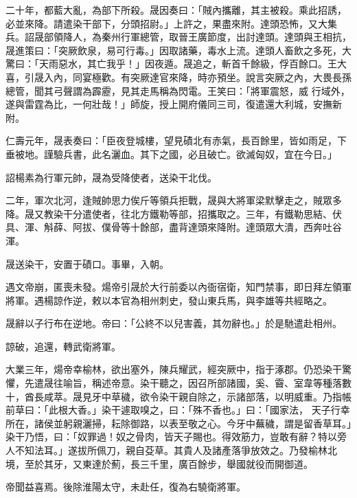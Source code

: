 \begin{pinyinscope}
 二十年，都藍大亂，為部下所殺。晟因奏曰：「賊內攜離，其主被殺。乘此招誘，必並來降。請遣染干部下，分頭招尉。」上許之，果盡來附。達頭恐怖，又大集兵。詔晟部領降人，為秦州行軍總管，取晉王廣節度，出討達頭。達頭與王相抗，晟進策曰：「突厥飲泉，易可行毒。」因取諸藥，毒水上流。達頭人畜飲之多死，大驚曰：「天雨惡水，其亡我乎！」因夜遁。晟追之，斬首千餘級，俘百餘口。王大喜，引晟入內，同宴極歡。有突厥達官來降，時亦預坐。說言突厥之內，大畏長孫總管，聞其弓聲謂為霹靂，見其走馬稱為閃電。王笑曰：「將軍震怒，威
 行域外，遂與雷霆為比，一何壯哉！」師旋，授上開府儀同三司，復遣還大利城，安撫新附。



 仁壽元年，晟表奏曰：「臣夜登城樓，望見磧北有赤氣，長百餘里，皆如雨足，下垂被地。謹驗兵書，此名灑血。其下之國，必且破亡。欲滅匈奴，宜在今日。」



 詔楊素為行軍元帥，晟為受降使者，送染干北伐。



 二年，軍次北河，逢賊帥思力俟斤等領兵拒戰，晟與大將軍梁默擊走之，賊眾多降。晟又教染干分遣使者，往北方鐵勒等部，招攜取之。三年，有鐵勒思結、伏具、渾、斛薛、阿拔、僕骨等十餘部，盡背達頭來降附。達頭眾大潰，西奔吐谷渾。



 晟送染干，安置于磧口。事畢，入朝。



 遇文帝崩，匿喪未發。煬帝引晟於大行前委以內衙宿衛，知門禁事，即日拜左領軍將軍。遇楊諒作逆，敕以本官為相州刺史，發山東兵馬，與李雄等共經略之。



 晟辭以子行布在逆地。帝曰：「公終不以兒害義，其勿辭也。」於是馳遣赴相州。



 諒破，追還，轉武衛將軍。



 大業三年，煬帝幸榆林，欲出塞外，陳兵耀武，經突厥中，指于涿郡。仍恐染干驚懼，先遣晟往喻旨，稱述帝意。染干聽之，因召所部諸國，奚、霫、室韋等種落數十，酋長咸萃。晟見牙中草穢，欲令染干親自除之，示諸部落，以明威重。乃指帳前草曰：「此根大香。」染干遽取嗅之，曰：「殊不香也。」曰：「國家法，
 天子行幸所在，諸侯並躬親灑掃，耘除御路，以表至敬之心。今牙中蕪穢，謂是留香草耳。」染干乃悟，曰：「奴罪過！奴之骨肉，皆天子賜也。得效筋力，豈敢有辭？特以旁人不知法耳。」遂拔所佩刀，親自芟草。其貴人及諸產落爭放效之。乃發榆林北境，至於其牙，又東達於薊，長三千里，廣百餘步，舉國就役而開御道。



 帝聞益喜焉。後除淮陽太守，未赴任，復為右驍衛將軍。




\end{pinyinscope}
